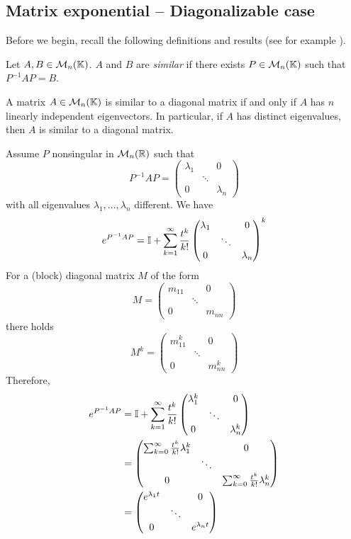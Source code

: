 \subsection{Matrix exponential -- Diagonalizable case}
Before we begin, recall the following definitions and results (see for example \cite{Franklin2000}).
\begin{definition}
Let $A,B\in\mathcal{M}_n(\mathbb{K})$. $A$ and $B$ are \emph{similar} if there exists $P\in\mathcal{M}_n(\mathbb{K})$ such that $P^{-1}AP=B$.
\end{definition}
\begin{theorem}
A matrix $A\in\mathcal{M}_n(\mathbb{K})$ is similar to a diagonal matrix if and only if $A$ has $n$ linearly independent eigenvectors. In particular, if $A$ has distinct eigenvalues, then $A$ is similar to a diagonal matrix.
\end{theorem}
Assume $P$ nonsingular in $\mathcal{M}_n(\mathbb{R})$ such that
\[
P^{-1}AP=
\begin{pmatrix}
\lambda_1 & & 0 \\
& \ddots & \\
0 & & \lambda_n
\end{pmatrix}
\]
with all eigenvalues $\lambda_1,\ldots,\lambda_n$ different.
We have
\[
e^{P^{-1}AP}=\mathbb{I}+\sum_{k=1}^\infty\frac{t^k}{k!}
\begin{pmatrix}
\lambda_1 & & 0 \\
& \ddots & \\
0 & & \lambda_n
\end{pmatrix}^k
\]
For a (block) diagonal matrix $M$ of the form
\[
M=
\begin{pmatrix}
m_{11} & & 0\\
& \ddots & \\
0 & & m_{nn}
\end{pmatrix}
\]
there holds
\[
M^k=
\begin{pmatrix}
m_{11}^k & & 0\\
& \ddots & \\
0 & & m_{nn}^k
\end{pmatrix}
\]
Therefore,
\begin{align*}
e^{P^{-1}AP} &= \mathbb{I}+\sum_{k=1}^\infty\frac{t^k}{k!}
\begin{pmatrix}
\lambda_1^k & & 0 \\
& \ddots & \\
0 & & \lambda_n^k
\end{pmatrix} \\
&=\begin{pmatrix}
\sum_{k=0}^\infty\frac{t^k}{k!}\lambda_1^k & & 0 \\
& \ddots & \\
0 & & \sum_{k=0}^\infty\frac{t^k}{k!}\lambda_n^k
\end{pmatrix}\\
&=\begin{pmatrix}
e^{\lambda_1t} & & 0 \\
& \ddots & \\
0 & & e^{\lambda_nt}
\end{pmatrix}
\end{align*}
